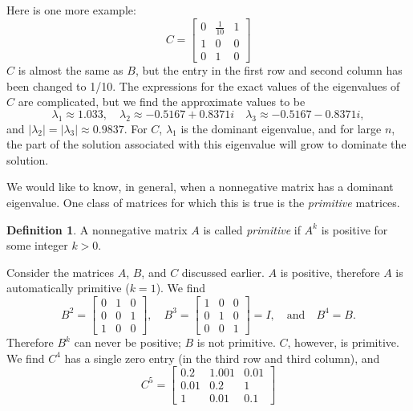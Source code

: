 \documentclass[reqno]{immbook}
\numberwithin{equation}{chapter}
\numberwithin{question}{section}
\numberwithin{theorem}{chapter}
\numberwithin{figure}{chapter}
\theoremstyle{definition}
\newtheorem{definition}{Definition}[section]
\begin{document}
Here is one more example:
\begin{equation}
   C = \begin{bmatrix}
             0 & \frac{1}{10} & 1 \\ 1 & 0 & 0 \\ 0 & 1 & 0
       \end{bmatrix}
\end{equation}
$C$ is almost the same as $B$, but the entry
in the first row and second column has been changed to 1/10.
The expressions for the exact values of the eigenvalues
of $C$ are complicated, but we find the approximate
values to be
\begin{equation}
  \lambda_1 \approx 1.033, \quad
  \lambda_2 \approx  -0.5167+0.8371i \quad
  \lambda_3 \approx  -0.5167-0.8371i,
\end{equation}
and $|\lambda_2| = |\lambda_3| \approx 0.9837$.
For $C$, $\lambda_1$ is the dominant eigenvalue, and for large
$n$, the part of the solution associated with this eigenvalue
will grow to dominate the solution.

We would like to know, in general, when a nonnegative matrix
has a dominant eigenvalue.
One class of matrices for which this is true is the
\emph{primitive} matrices.

\begin{definition}
A nonnegative matrix $A$ is called
\emph{primitive}
if $A^k$ is positive for some integer $k > 0$.
\end{definition}
Consider the matrices $A$, $B$, and $C$ discussed earlier.
$A$ is positive, therefore $A$ is automatically primitive ($k=1$).
We find
\begin{equation}
   B^2 = \begin{bmatrix}
             0 & 1 & 0 \\ 0 & 0 & 1 \\ 1 & 0 & 0
       \end{bmatrix}, \quad
   B^3 = \begin{bmatrix}
             1 & 0 & 0 \\ 0 & 1 & 0 \\ 0 & 0 & 1
       \end{bmatrix} = I, \quad \textrm{and} \quad
   B^4 = B.
\end{equation}
Therefore $B^k$ can never be positive;  $B$ is not primitive.
$C$, however, is primitive. We find $C^4$ has a single zero
entry (in the third row and third column), and
\begin{equation}
  C^5 = \begin{bmatrix}
           0.2 & 1.001 & 0.01 \\
           0.01  & 0.2 & 1 \\
           1 & 0.01 & 0.1
        \end{bmatrix}
\end{equation}
\end{document}
